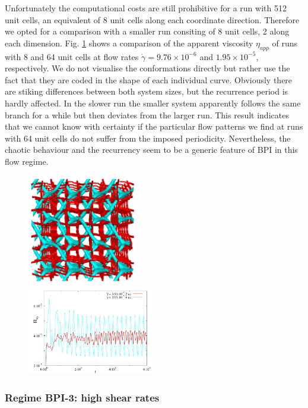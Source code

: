 \documentclass[aps,pre,reprint,superscriptaddress, twocolumn]{revtex4}
\newcommand{\e}[1]{\times10^{#1}}
\newcommand{\gd}{\dot{\gamma}}
\begin{document}
Unfortunately the computational costs are still prohibitive for a run 
with 512 unit cells, an equivalent of 8 unit cells along each coordinate 
direction. Therefore we opted for a comparison with a smaller run consiting
of 8 unit cells, 2 along each dimension.
Fig. \ref{bp1-2uc4uc} shows a comparison of the apparent viscosity $\eta_{app}$ 
of runs with 8 and 64 unit cells at flow rates 
$\gd=9.76\e{-6}$ and $1.95\e{-5}$, respectively.
We do not visualise the conformations directly but rather use the fact that 
they are coded in the shape of each individual curve. Obviously there 
are stiking differences between 
both system sizes, but the recurrence period is hardly affected. In the slower
run the smaller system apparently follows the same branch for a while but then
deviates from the larger run. 
This result indicates that we cannot know with certainty if the particular flow patterns 
we find at runs with 64 unit cells do not suffer from the imposed periodicity.
Nevertheless, the chaotic behaviour and the recurrency seem to be a generic
feature of BPI in this flow regime.
 
\begin{figure}[htpb]
\includegraphics[width=0.43\textwidth]{disc+y-600k-run911_run1163.png}\\
\includegraphics[width=0.495\textwidth]{stress_bp1_2uc_4uc.pdf}
\caption{}
\label{bp1-2uc4uc}
\end{figure}

\subsubsection{Regime BPI-3: high shear rates}
\end{document}
